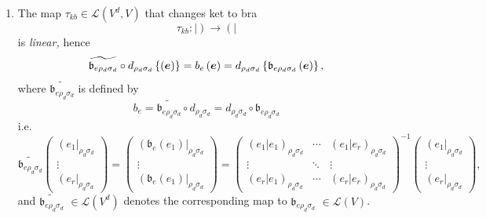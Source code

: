 \documentclass[aps,preprint]{revtex4}
\begin{document}
\begin{enumerate}
\item The map $\tau _{kb}\in \mathcal{L}\left( V^{d},V\right) $ that changes
ket to bra 
\begin{equation}
\tau _{kb}:\left\vert {}\right) \rightarrow \left( {}\right\vert
\end{equation}%
is \emph{linear, }hence 
\begin{equation}
\widetilde{\mathfrak{b}_{e\rho _{d}\sigma _{d}}}\circ d_{\rho _{d}\sigma
_{d}}\left\{ \left( \overset{}{\boldsymbol{e}}\right) \right\} =b_{e}\left( 
\overset{}{\boldsymbol{e}}\right) =d_{\rho _{d}\sigma _{d}}\left\{ \mathfrak{%
b}_{e\rho _{d}\sigma _{d}}\left( \overset{}{\boldsymbol{e}}\right) \right\} ,
\end{equation}%
where $\widetilde{\mathfrak{b}_{e\rho _{d}\sigma _{d}}}$ is defined by 
\begin{equation}
b_{e}=\widetilde{\mathfrak{b}_{e\rho _{d}\sigma _{d}}}\circ d_{\rho
_{d}\sigma _{d}}=d_{\rho _{d}\sigma _{d}}\circ \mathfrak{b}_{e\rho
_{d}\sigma _{d}}
\end{equation}%
i.e. 
\begin{equation}
\widetilde{\mathfrak{b}_{e\rho _{d}\sigma _{d}}}\left( 
\begin{array}{c}
\left( e_{1}\right\vert _{\rho _{d}\sigma _{d}} \\ 
\vdots \\ 
\left( e_{r}\right\vert _{\rho _{d}\sigma _{d}}%
\end{array}%
\right) =\left( 
\begin{array}{c}
\left( \mathfrak{b}_{e}\left( e_{1}\right) \right\vert _{\rho _{d}\sigma
_{d}} \\ 
\vdots \\ 
\left( \mathfrak{b}_{e}\left( e_{1}\right) \right\vert _{\rho _{d}\sigma
_{d}}%
\end{array}%
\right) =\left( 
\begin{array}{ccc}
\left( \left. e_{1}\right\vert e_{1}\right) _{\rho _{d}\sigma _{d}} & \cdots
& \left( \left. e_{1}\right\vert e_{r}\right) _{\rho _{d}\sigma _{d}} \\ 
\vdots & \ddots & \vdots \\ 
\left( \left. e_{r}\right\vert e_{1}\right) _{\rho _{d}\sigma _{d}} & \cdots
& \left( \left. e_{r}\right\vert e_{r}\right) _{\rho _{d}\sigma _{d}}%
\end{array}%
\right) ^{\boldsymbol{-}1}\left( 
\begin{array}{c}
\left( e_{1}\right\vert _{\rho _{d}\sigma _{d}} \\ 
\vdots \\ 
\left( e_{r}\right\vert _{\rho _{d}\sigma _{d}}%
\end{array}%
\right) ,
\end{equation}%
and $\widetilde{\mathfrak{b}_{e\rho _{d}\sigma _{d}}}$ $\in \mathcal{L}%
\left( V^{d}\right) $ denotes the corresponding map to $\mathfrak{b}_{e\rho
_{d}\sigma _{d}}$ $\in \mathcal{L}\left( V\right) $.


\end{enumerate}
\end{document}
